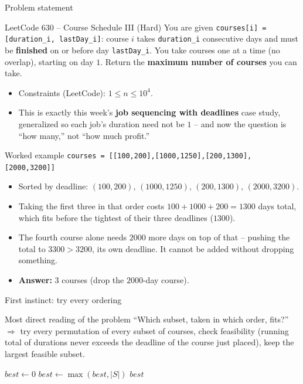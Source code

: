 \documentclass[11pt,aspectratio=169]{beamer}
\begin{document}
\begin{frame}{Problem statement}
  \begin{block}{LeetCode 630 -- Course Schedule III (\textcolor{red!60!black}{Hard})}
    You are given \texttt{courses[i] = [duration\_i, lastDay\_i]}: course $i$ takes
    \texttt{duration\_i} consecutive days and must be \textbf{finished} on or before day
    \texttt{lastDay\_i}. You take courses one at a time (no overlap), starting on day
    $1$. Return the \textbf{maximum number of courses} you can take.
  \end{block}
  \begin{itemize}
    \item Constraints (LeetCode): $1 \le n \le 10^4$.
    \item This is exactly this week's \textbf{job sequencing with deadlines} case
    study, generalized so each job's duration need not be $1$ -- and now the question
    is ``how many,'' not ``how much profit.''
  \end{itemize}
\end{frame}

\begin{frame}{Worked example}
  \small
  \texttt{courses = [[100,200],[1000,1250],[200,1300],[2000,3200]]}
  \begin{itemize}
    \item Sorted by deadline: $(100,200),\,(1000,1250),\,(200,1300),\,(2000,3200)$.
    \item Taking the first three in that order costs $100+1000+200 = 1300$ days total,
    which fits before the tightest of their three deadlines ($1300$).
    \item The fourth course alone needs $2000$ more days on top of that -- pushing the
    total to $3300 > 3200$, its own deadline. It cannot be added without dropping
    something.
    \item \textbf{Answer:} $3$ courses (drop the $2000$-day course).
  \end{itemize}
\end{frame}

\begin{frame}{First instinct: try every ordering}
  \begin{block}{Most direct reading of the problem}
    ``Which subset, taken in which order, fits?'' $\Rightarrow$ try every permutation
    of every subset of courses, check feasibility (running total of durations never
    exceeds the deadline of the course just placed), keep the largest feasible subset.
  \end{block}
  \begin{algorithmic}[1]
    \State $best \gets 0$
        \State $best \gets \max(best, |S|)$
      \EndIf
    \EndFor
    \State \Return $best$
  \end{algorithmic}
\end{frame}
\end{document}
